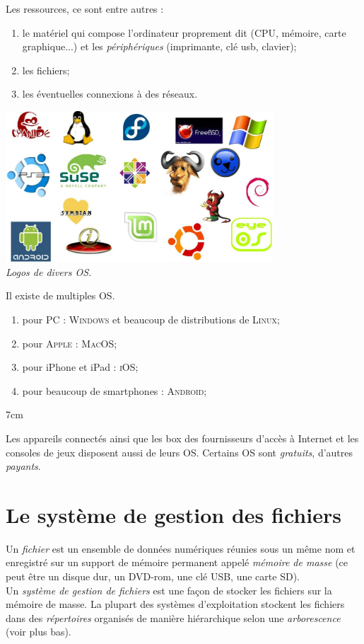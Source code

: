 \documentclass[a5paper,12pt,french,landscape]{book}
\begin{document}
	Les ressources, ce sont entre autres : 
	\begin{enumerate}[--]
		\item 	le matériel qui compose l'ordinateur proprement dit (CPU, mémoire, carte graphique...) et les \textit{périphériques} (imprimante, clé usb, clavier);
		\item 	les fichiers;
		\item 	les éventuelles connexions à des réseaux.
	\end{enumerate}
	\double
	{
		\begin{center}
			\includegraphics[width=10cm]{oss.png}\\
			\footnotesize\textit{ Logos de divers OS.}
		\end{center}

	}
	{
		Il existe de multiples OS.
		\begin{enumerate}[--]
			\item 	pour PC : \textsc{Windows} et beaucoup de distributions de \textsc{Linux};
			\item 	pour \textsc{Apple} : \textsc{MacOS};
			\item	pour iPhone et iPad : \textsc{iOS};
			\item 	pour beaucoup de smartphones : \textsc{Android};
		\end{enumerate}
	}{7cm}

	Les appareils connectés ainsi que les \og box \fg{} des fournisseurs d'accès à Internet et les consoles de jeux disposent aussi de leurs OS.
	Certains OS sont \textit{gratuits}, d'autres \textit{payants}.
	
	\section*{Le système de gestion des fichiers}
	
	Un \textit{fichier} est un ensemble de données numériques réunies sous un même nom et enregistré sur un support de mémoire permanent appelé \textit{mémoire de masse} (ce peut être un disque dur, un DVD-rom, une clé USB, une carte SD).\\
	Un \textit{système de gestion de fichiers} est une façon de stocker les fichiers sur la mémoire de masse. La plupart des systèmes d'exploitation stockent les fichiers dans des \textit{répertoires} organisés de manière hiérarchique selon une \textit{arborescence} (voir plus bas).
\end{document}
